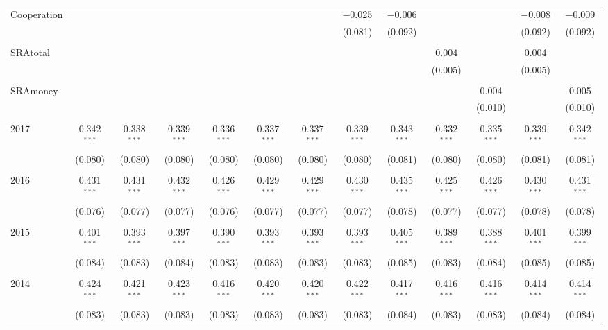 \begin{table}[H]
\begin{adjustbox}{width=\textwidth}
\begin{tabular}{@{\extracolsep{5pt}}lcccccccccccc}
 Cooperation &  &  &  &  &  &  & $-$0.025 & $-$0.006 &  &  & $-$0.008 & $-$0.009 \\ 
  &  &  &  &  &  &  & (0.081) & (0.092) &  &  & (0.092) & (0.092) \\ 
  & & & & & & & & & & & & \\ 
 SRAtotal &  &  &  &  &  &  &  &  & 0.004 &  & 0.004 &  \\ 
  &  &  &  &  &  &  &  &  & (0.005) &  & (0.005) &  \\ 
  & & & & & & & & & & & & \\ 
 SRAmoney &  &  &  &  &  &  &  &  &  & 0.004 &  & 0.005 \\ 
  &  &  &  &  &  &  &  &  &  & (0.010) &  & (0.010) \\ 
  & & & & & & & & & & & & \\ 
 2017 & 0.342$^{***}$ & 0.338$^{***}$ & 0.339$^{***}$ & 0.336$^{***}$ & 0.337$^{***}$ & 0.337$^{***}$ & 0.339$^{***}$ & 0.343$^{***}$ & 0.332$^{***}$ & 0.335$^{***}$ & 0.339$^{***}$ & 0.342$^{***}$ \\ 
  & (0.080) & (0.080) & (0.080) & (0.080) & (0.080) & (0.080) & (0.080) & (0.081) & (0.080) & (0.080) & (0.081) & (0.081) \\ 
  & & & & & & & & & & & & \\ 
 2016 & 0.431$^{***}$ & 0.431$^{***}$ & 0.432$^{***}$ & 0.426$^{***}$ & 0.429$^{***}$ & 0.429$^{***}$ & 0.430$^{***}$ & 0.435$^{***}$ & 0.425$^{***}$ & 0.426$^{***}$ & 0.430$^{***}$ & 0.431$^{***}$ \\ 
  & (0.076) & (0.077) & (0.077) & (0.076) & (0.077) & (0.077) & (0.077) & (0.078) & (0.077) & (0.077) & (0.078) & (0.078) \\ 
  & & & & & & & & & & & & \\ 
 2015 & 0.401$^{***}$ & 0.393$^{***}$ & 0.397$^{***}$ & 0.390$^{***}$ & 0.393$^{***}$ & 0.393$^{***}$ & 0.393$^{***}$ & 0.405$^{***}$ & 0.389$^{***}$ & 0.388$^{***}$ & 0.401$^{***}$ & 0.399$^{***}$ \\ 
  & (0.084) & (0.083) & (0.084) & (0.083) & (0.083) & (0.083) & (0.083) & (0.085) & (0.083) & (0.084) & (0.085) & (0.085) \\ 
  & & & & & & & & & & & & \\ 
 2014 & 0.424$^{***}$ & 0.421$^{***}$ & 0.423$^{***}$ & 0.416$^{***}$ & 0.420$^{***}$ & 0.420$^{***}$ & 0.422$^{***}$ & 0.417$^{***}$ & 0.416$^{***}$ & 0.416$^{***}$ & 0.414$^{***}$ & 0.414$^{***}$ \\ 
  & (0.083) & (0.083) & (0.083) & (0.083) & (0.083) & (0.083) & (0.083) & (0.084) & (0.083) & (0.083) & (0.084) & (0.084) \\ 

\end{tabular}
\end{adjustbox}
\end{table}
